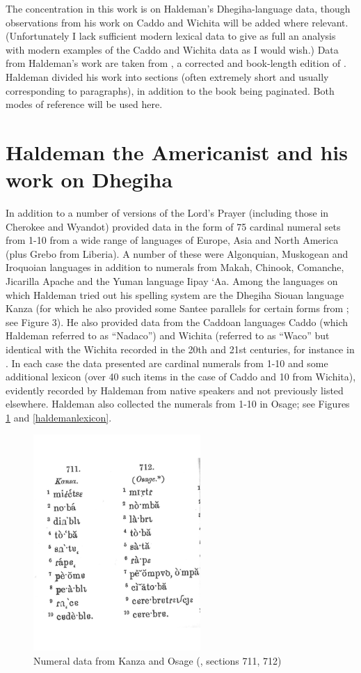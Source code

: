 \documentclass[output=paper]{LSP/langsci}
\begin{document}
The concentration in this work is on Haldeman's Dhegiha-language data, though observations from his work on Caddo and Wichita will be added where relevant. (Unfortunately I lack sufficient modern lexical data to give as full an analysis with modern examples of the Caddo and Wichita data as I would wish.)   Data from Haldeman's work are taken from \citet{Haldeman1860}, a corrected and book-length edition of \citet{Haldeman1859}.  Haldeman divided his work into sections (often extremely short and usually corresponding to paragraphs), in addition to the book being paginated.  Both modes of reference will be used here.  

\section{Haldeman the Americanist and his work on Dhegiha}  

In addition to a number of versions of the Lord's Prayer (including those in Cherokee and Wyandot) \citet{Haldeman1860}  provided data in the form of 75 cardinal numeral sets from 1-10 from a wide range of languages of Europe, Asia and North America (plus Grebo from Liberia).  A number of these were Algonquian, Muskogean and Iroquoian languages in addition to numerals from Makah, Chinook, Comanche, Jicarilla Apache and the Yuman language Iipay `Aa. Among the languages on which Haldeman tried out his spelling system are the Dhegiha Siouan language Kanza (for which he also provided some Santee parallels for certain forms from \citealt{Riggs1852}; see Figure 3).  He also provided data from the Caddoan languages Caddo (which Haldeman referred to as ``Nadaco'') and Wichita (referred to as ``Waco'' but identical with the Wichita recorded in the 20th and 21st centuries, for instance in \citet{Rood1975}. In each case the data presented are cardinal numerals from 1-10 and some additional lexicon (over 40 such items in the case of Caddo and 10 from Wichita), evidently recorded by Haldeman from native speakers and not previously listed elsewhere. Haldeman also collected the numerals from 1-10 in Osage; see Figures \ref{haldemannumerals} and \ref{haldemanlexicon}.   

\begin{figure}
\centering
\caption{Numeral data from Kanza and Osage (\citealt[3]{Haldeman1860}, sections 711, 712)} \label{haldemannumerals}
\includegraphics[width=2.5in,angle=-2]{figures/GrantNumerals}
\end{figure}
\end{document}
